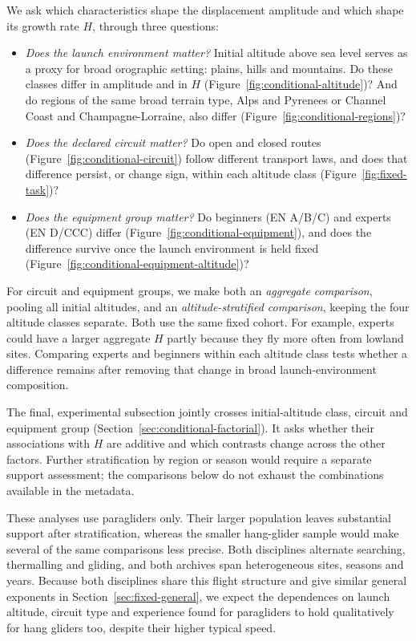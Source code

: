We ask which characteristics shape the displacement amplitude and which shape
its growth rate $H$, through three questions:
\begin{itemize}
 \item \emph{Does the launch environment matter?} Initial altitude above sea level
 serves as a proxy for broad orographic setting: plains, hills and mountains. Do
 these classes differ in amplitude and in $H$
 (Figure~\ref{fig:conditional-altitude})? And do regions of the same broad terrain
 type, Alps and Pyrenees or Channel Coast and Champagne-Lorraine, also differ
 (Figure~\ref{fig:conditional-regions})?
 \item \emph{Does the declared circuit matter?} Do open and closed routes
 (Figure~\ref{fig:conditional-circuit}) follow different transport laws, and does
 that difference persist, or change sign, within each altitude class
 (Figure~\ref{fig:fixed-task})?
 \item \emph{Does the equipment group matter?} Do beginners (EN A/B/C) and experts
 (EN D/CCC) differ (Figure~\ref{fig:conditional-equipment}), and does the
 difference survive once the launch environment is held fixed
 (Figure~\ref{fig:conditional-equipment-altitude})?
\end{itemize}
For circuit and equipment groups, we make both an \emph{aggregate comparison},
pooling all initial altitudes, and an \emph{altitude-stratified comparison},
keeping the four altitude classes separate. Both use the same fixed cohort.
For example, experts could have a larger aggregate $H$ partly because they fly
more often from lowland sites. Comparing experts and beginners within each
altitude class tests whether a difference remains after removing that change
in broad launch-environment composition.

The final, experimental subsection jointly crosses initial-altitude class,
circuit and equipment group (Section~\ref{sec:conditional-factorial}). It asks
whether their associations with $H$ are additive and which contrasts change
across the other factors. Further stratification by region or season would
require a separate support assessment; the comparisons below do not exhaust
the combinations available in the metadata.

These analyses use paragliders only. Their larger population leaves substantial
support after stratification, whereas the smaller hang-glider sample would make
several of the same comparisons less precise. Both disciplines alternate searching,
thermalling and gliding, and both archives span heterogeneous sites, seasons and
years. Because both disciplines share this flight structure and give similar general
exponents in Section~\ref{sec:fixed-general}, we expect the dependences on
launch altitude, circuit type and experience found for paragliders to hold
qualitatively for hang gliders too, despite their higher typical speed. 

